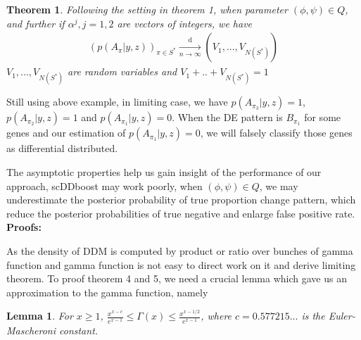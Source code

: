 \documentclass[aoas,preprint]{imsart}
\newtheorem{lemma}{Lemma}
\newtheorem{theorem}{Theorem}
\begin{document}
\begin{theorem} Following the setting in theorem 1, when parameter $(\phi, \psi)\in Q$,  and further if $\alpha^j, j = 1,2$ are vectors of integers, we have 
\begin{eqnarray*}
    (p(A_{\pi} | y, z))_{\pi\in S^*} \xrightarrow[n\rightarrow\infty]{\text{d}}%
                (V_1, ..., V_{N(S^*)})
\end{eqnarray*}
$V_1, ..., V_{N(S^*)}$ are random variables and $V_1 + .. + V_{N(S^*)} = 1$
 \end{theorem} 

Still using above example, in limiting case, we have $p(A_{\pi_3} | y,z) = 1$, $p(A_{\pi_2} | y,z) = 1$ and $p(A_{\pi_1}| y,z) = 0$. When the DE pattern is $B_{\pi_1}$ for some genes and our estimation of $p(A_{\pi_1}| y,z) = 0$, we will falsely classify those genes as differential distributed.

The asymptotic properties help us gain insight of the performance of our approach,
scDDboost may work poorly, when $(\phi, \psi)\in Q$, we may underestimate the posterior probability of true proportion change pattern, which reduce the posterior probabilities of true negative and enlarge false positive rate.\\







\noindent
{\bf Proofs:}

As the density of DDM is computed by product or ratio over bunches of gamma function and gamma function is not easy to direct work on it and derive limiting theorem.
To proof theorem 4 and 5, we need a crucial lemma which gave us an approximation to the gamma function, namely

\begin{lemma}
For $x \geq 1$, $\frac{x^{x - c}}{e^{x - 1}} \leq \Gamma(x) \leq \frac{x^{x-1/2}}{e^{x - 1}}$, where $c = 0.577215...$ is the Euler-Mascheroni constant.
\end{lemma}
\end{document}

